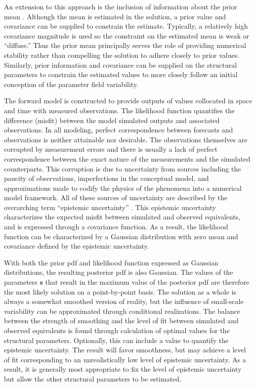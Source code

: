 \documentclass[11pt,oneside,onecolumn]{usgsreport}
\begin{document}
\begin{multicols}{2}
An extension to this approach is the inclusion of information about
the prior mean \citep{NowakCirpka2004}. Although the mean is estimated
in the solution, a prior value and covariance can be supplied to constrain
the estimate. Typically, a relatively high covariance magnitude is
used so the constraint on the estimated mean is weak or ``diffuse.''
Thus the prior mean principally serves the role of providing numerical
stability rather than compelling the solution to adhere closely to
prior values. Similarly, prior information and covariance can be supplied
on the structural parameters to constrain the estimated values to
more closely follow an initial conception of the parameter field variability.

The forward model is constructed to provide outputs of values collocated
in space and time with measured observations. The likelihood function
quantifies the difference (misfit) between the model simulated outputs
and associated observations. In all modeling, perfect correspondence
between forecasts and observations is neither attainable nor desirable.
The observations themselves are corrupted by measurement errors and
there is usually a lack of perfect correspondence between the exact
nature of the measurements and the simulated counterparts. This corruption
is due to uncertainty from sources including the paucity of observations,
imperfections in the conceptual model, and approximations made to
codify the physics of the phenomena into a numerical model framework.
All of these sources of uncertainty are described by the overarching
term ``epistemic uncertainty'' \citep[p. 4]{Rubin2003}. This epistemic
uncertainty characterizes the expected misfit between simulated and
observed equivalents, and is expressed through a covariance function.
As a result, the likelihood function can be characterized by a Gaussian
distribution with zero mean and covariance defined by the epistemic
uncertainty.

With both the prior pdf and likelihood function expressed as Gaussian
distributions, the resulting posterior pdf is also Gaussian. The values
of the parameters $\mathbf{s}$ that result in the maximum value of
the posterior pdf are therefore the most likely solution on a point-by-point
basis. The solution as a whole is always a somewhat smoothed version
of reality, but the influence of small-scale variability can be approximated
through conditional realizations. The balance between the strength
of smoothing and the level of fit between simulated and observed equivalents
is found through calculation of optimal values for the structural
parameters. Optionally, this can include a value to quantify the epistemic
uncertainty. The result will favor smoothness, but may achieve a level
of fit corresponding to an unrealistically low level of epistemic
uncertainty. As a result, it is generally most appropriate to fix
the level of epistemic uncertainty but allow the other structural
parameters to be estimated.


\end{multicols}
\end{document}
